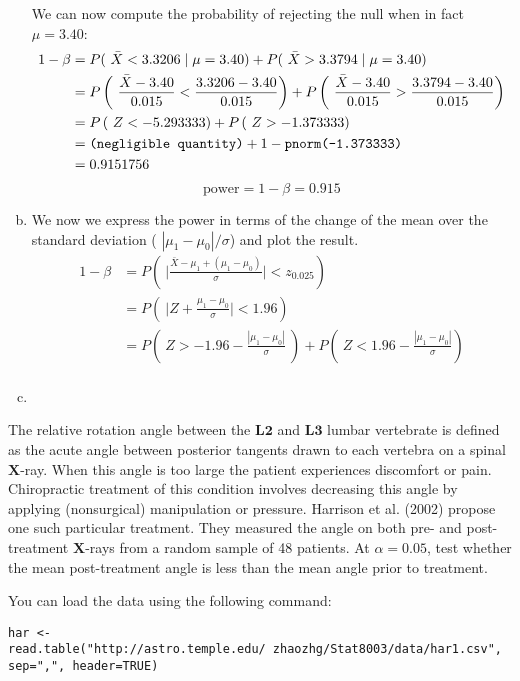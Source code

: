 \documentclass[12pt]{article}
\newenvironment{question}[2][Question]{\begin{trivlist}
\item[\hskip \labelsep {\bfseries #1}\hskip \labelsep {\bfseries #2.}]}{\end{trivlist}}
\begin{document}
\begin{enumerate}[(a)]
We can now compute the probability of rejecting the null when in fact $\mu = 3.40$:
\begin{align*}
1 - \beta &= P ( \ \bar X < 3.3206 \mid \mu = 3.40 ) + P ( \ \bar X > 3.3794 \mid \mu = 3.40 ) \\
&= P \left( \ \frac{\bar X - 3.40}{0.015} < \frac{3.3206 - 3.40}{0.015} \right) + P \left( \ \frac{\bar X - 3.40}{0.015} > \frac{3.3794 - 3.40}{0.015} \right)  \\
&= P \left( \ Z <  -5.293333 \right) + P \left( \ Z >  -1.373333 \right) \\
&= \text{\texttt{(negligible quantity)}} + 1 -  \text{\texttt{pnorm(-1.373333)}}\\
&= 0.9151756
\end{align*}
$$
\boxed{\text{power}  = 1 - \beta  = 0.915}
$$

\item We now we express the power in terms of the change of the mean over the standard deviation ( $ | \mu_1 - \mu_0 | / \sigma$) and plot the result.
\begin{align*}
1 - \beta &= P \left( \ \Big| \frac{\bar X - \mu_1 + (\mu_1 - \mu_0)}{\sigma} \Big| < z_{0.025} \right) \\
&= P \left( \ \Big|  Z +  \frac{\mu_1 - \mu_0} {\sigma}  \Big| <  1.96 \right) \\
&= P \left( \ Z > -1.96 -  \frac{ | \mu_1 - \mu_0 | } {\sigma}  \ \right)  + P \left( \ Z < 1.96 -  \frac{ | \mu_1 - \mu_0 | } {\sigma}  \right)  \\
\end{align*}

\item

\end{enumerate}
\bigskip
\bigskip
 \begin{question}{7.2}  The relative rotation angle between the $\mathbf{L2}$ and $\mathbf{L3}$  lumbar vertebrate is defined as the acute
angle between posterior tangents drawn to each vertebra on a spinal $\mathbf{X}$-ray. When this angle is too
large the patient experiences discomfort or pain. Chiropractic treatment of this condition involves
decreasing this angle by applying (nonsurgical) manipulation or pressure. Harrison et al. (2002)
propose one such particular treatment. They measured the angle on both pre- and post-treatment
$\mathbf{X}$-rays from a random sample of 48 patients. At $\alpha = 0.05$, test whether the mean post-treatment
angle is less than the mean angle prior to treatment.


You can load the data using the following command:


\texttt{har <- read.table("http://astro.temple.edu/~zhaozhg/Stat8003/data/har1.csv", sep=",", header=TRUE)}
\end{question} 
\end{document}
